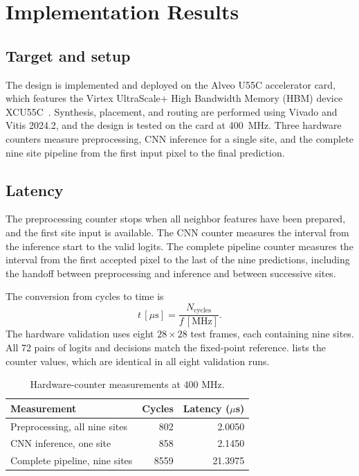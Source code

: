 \section{Implementation Results}\label{sec:results}

\subsection{Target and setup}

The design is implemented and deployed on the Alveo U55C accelerator card, which features the Virtex UltraScale+ High Bandwidth Memory (HBM) device XCU55C~\cite{amd2026u55c}. Synthesis, placement, and routing are performed using Vivado and Vitis 2024.2, and the design is tested on the card at \SI{400}{\mega\hertz}. Three hardware counters measure preprocessing, CNN inference for a single site, and the complete nine site pipeline from the first input pixel to the final prediction.

\subsection{Latency}\label{sec:hardware-latency}

The preprocessing counter stops when all neighbor features have been prepared, and the first site input is available. The CNN counter measures the interval from the inference start to the valid logits. The complete pipeline counter measures the interval from the first accepted pixel to the last of the nine predictions, including the handoff between preprocessing and inference and between successive sites.

The conversion from cycles to time is
\[
    t\,[\mu\mathrm{s}] = \frac{N_{\mathrm{cycles}}}{f\,[\mathrm{MHz}]}.
\]
The hardware validation uses eight $28\times28$ test frames, each containing nine sites. All 72 pairs of logits and decisions match the fixed-point reference.  lists the counter values, which are identical in all eight validation runs.

\begin{table}[H]
    \centering
    \caption{Hardware-counter measurements at 400 MHz.}
    \label{tab:hardware-latency}
    \begin{tabular}{@{}lrr@{}}
        \toprule
        Measurement & Cycles & Latency ($\mu$s) \\
        \midrule
        Preprocessing, all nine sites & \num{802}  & \num{2.0050} \\
        CNN inference, one site       & \num{858}  & \num{2.1450} \\
        Complete pipeline, nine sites & \num{8559} & \num{21.3975} \\
        \bottomrule
    \end{tabular}
\end{table}

